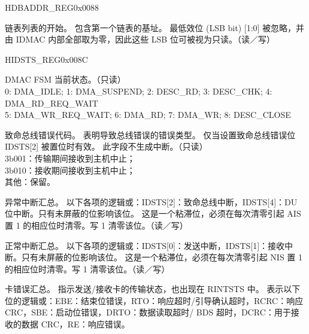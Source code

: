 \begin{register}{H}{DBADDR\_REG}{0x0088}\label{regdesc:DBADDRREG}
%
\regnewline%
\begin{regdesc}\begin{reglist}
\item [DBADDR\_REG]链表列表的开始。 包含第一个链表的基址。 最低效位 (LSB bit) [1:0] 被忽略，并由 IDMAC 内部全部取为零，因此这些 LSB 位可被视为只读。（读／写）
\end{reglist}\end{regdesc}
\end{register}


\begin{register}{H}{IDSTS\_REG}{0x008C}\label{regdesc:IDSTSREG}
%
%
%
%
%
%
%
%
%
%
%
%
\regnewline%
\begin{regdesc}\begin{reglist}
\item [IDSTS\_FSM]DMAC FSM 当前状态。（只读）\\
0: DMA\_IDLE; 1: DMA\_SUSPEND; 2: DESC\_RD; 3: DESC\_CHK; 4: DMA\_RD\_REQ\_WAIT\\
5: DMA\_WR\_REQ\_WAIT; 6: DMA\_RD; 7: DMA\_WR; 8: DESC\_CLOSE\\
\item [IDSTS\_FBE\_CODE]致命总线错误代码。 表明导致总线错误的错误类型。 仅当设置致命总线错误位 IDSTS[2] 被置位时有效。 此字段不生成中断。（只读）\\ 3b001：传输期间接收到主机中止；\\
3b010：接收期间接收到主机中止；\\
其他：保留。
\item [IDSTS\_AIS]异常中断汇总。 以下各项的逻辑或：IDSTS[2]：致命总线中断，IDSTS[4]：DU 位中断。只有未屏蔽的位影响该位。 这是一个粘滞位，必须在每次清零引起 AIS 置 1 的相应位时清零。写 1 清零该位。（读／写）
\item [IDSTS\_NIS]正常中断汇总。 以下各项的逻辑或：IDSTS[0]：发送中断，IDSTS[1]：接收中断。只有未屏蔽的位影响该位。 这是一个粘滞位，必须在每次清零引起 NIS 置 1 的相应位时清零。写 1 清零该位。（读／写）
\item [IDSTS\_CES]卡错误汇总。 指示发送/接收卡的传输状态，也出现在 RINTSTS 中。 表示以下位的逻辑或：EBE：结束位错误，RTO：响应超时/引导确认超时，RCRC：响应 CRC，SBE：启动位错误，DRTO：数据读取超时/ BDS 超时，DCRC：用于接收的数据 CRC，RE：响应错误。\\

\end{reglist}
\end{regdesc}
\end{register}
